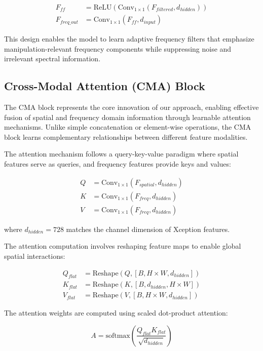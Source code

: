 \documentclass[letterpaper]{article} %
\begin{document}
\begin{align}
F_{ff} &= \text{ReLU}(\text{Conv}_{1 \times 1}(F_{filtered}, d_{hidden})) \\
F_{freq\_out} &= \text{Conv}_{1 \times 1}(F_{ff}, d_{input})
\end{align}

This design enables the model to learn adaptive frequency filters that emphasize manipulation-relevant frequency components while suppressing noise and irrelevant spectral information.

\subsection{Cross-Modal Attention (CMA) Block}

The CMA block represents the core innovation of our approach, enabling effective fusion of spatial and frequency domain information through learnable attention mechanisms. Unlike simple concatenation or element-wise operations, the CMA block learns complementary relationships between different feature modalities.

The attention mechanism follows a query-key-value paradigm where spatial features serve as queries, and frequency features provide keys and values:

\begin{align}
Q &= \text{Conv}_{1 \times 1}(F_{spatial}, d_{hidden}) \\
K &= \text{Conv}_{1 \times 1}(F_{freq}, d_{hidden}) \\
V &= \text{Conv}_{1 \times 1}(F_{freq}, d_{hidden})
\end{align}

where $d_{hidden} = 728$ matches the channel dimension of Xception features.

The attention computation involves reshaping feature maps to enable global spatial interactions:

\begin{align}
Q_{flat} &= \text{Reshape}(Q, [B, H \times W, d_{hidden}]) \\
K_{flat} &= \text{Reshape}(K, [B, d_{hidden}, H \times W]) \\
V_{flat} &= \text{Reshape}(V, [B, H \times W, d_{hidden}])
\end{align}

The attention weights are computed using scaled dot-product attention:

\begin{equation}
A = \text{softmax}\left(\frac{Q_{flat} K_{flat}}{\sqrt{d_{hidden}}}\right)
\end{equation}
\end{document}
